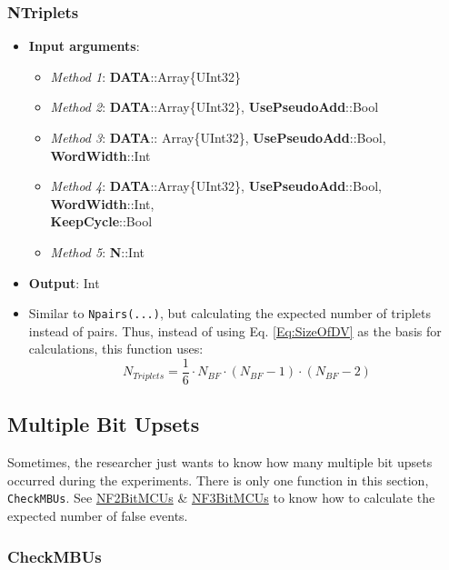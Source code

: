 \subsubsection*{NTriplets}\label{Func:NTriplets}
\begin{itemize}
	\item \textbf{Input arguments}:
	\begin{itemize}
		\item \textit{Method 1}: \textbf{DATA}::Array\{UInt32\}
		\item \textit{Method 2}: \textbf{DATA}::Array\{UInt32\}, \textbf{UsePseudoAdd}::Bool
		\item \textit{Method 3}: \textbf{DATA}:: Array\{UInt32\}, \textbf{UsePseudoAdd}::Bool, \textbf{WordWidth}::Int
		\item \textit{Method 4}: \textbf{DATA}::Array\{UInt32\}, \textbf{UsePseudoAdd}::Bool, \textbf{WordWidth}::Int,\\ \textbf{KeepCycle}::Bool
		\item \textit{Method 5}: \textbf{N}::Int
	\end{itemize}
	\item \textbf{Output}: Int
	\item Similar to \texttt{Npairs(...)}, but calculating the expected number of triplets instead of pairs. Thus, instead of using Eq. \ref{Eq:SizeOfDV} as the basis for calculations, this function uses:
	\[
		N_{Triplets} = \frac{1}{6}\cdot N_{BF}\cdot \left(N_{BF}-1\right)\cdot \left(N_{BF}-2\right)
	\]
\end{itemize}
%
\subsection{Multiple Bit Upsets} \label{SubSeC:MBUs}
%
Sometimes, the researcher just wants to know how many multiple bit upsets occurred during the experiments. There is only one function in this section, \texttt{CheckMBUs}. See \hyperref[Fun:NF2BitMCUs]{NF2BitMCUs} \& \hyperref[Fun:NF3BitMCUs]{NF3BitMCUs} to know how to calculate the expected number of false events.

\subsubsection*{CheckMBUs}

